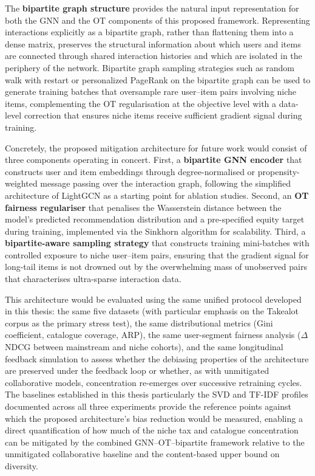 \documentclass[11pt,a4paper]{report}
\begin{document}
The \textbf{bipartite graph structure} provides the natural input representation for
both the GNN and the OT components of this proposed framework. Representing
interactions explicitly as a bipartite graph, rather than flattening them into a
dense matrix, preserves the structural information about which users and items are
connected through shared interaction histories and which are isolated in the periphery
of the network. Bipartite graph sampling strategies such as random walk with restart
\citep{tong2006fast} or personalized PageRank on the bipartite graph can be used
to generate training batches that oversample rare user--item pairs involving niche
items, complementing the OT regularisation at the objective level with a
data-level correction that ensures niche items receive sufficient gradient signal
during training.

Concretely, the proposed mitigation architecture for future work would consist of
three components operating in concert. First, a \textbf{bipartite GNN encoder}
that constructs user and item embeddings through degree-normalised or
propensity-weighted message passing over the interaction graph, following the
simplified architecture of LightGCN \citep{he2020lightgcn} as a starting point for
ablation studies. Second, an \textbf{OT fairness regulariser} that penalises the
Wasserstein distance between the model's predicted recommendation distribution and
a pre-specified equity target during training, implemented via the Sinkhorn
algorithm for scalability. Third, a \textbf{bipartite-aware sampling strategy} that
constructs training mini-batches with controlled exposure to niche user--item pairs,
ensuring that the gradient signal for long-tail items is not drowned out by the
overwhelming mass of unobserved pairs that characterises ultra-sparse interaction
data.

This architecture would be evaluated using the same unified protocol developed in
this thesis: the same five datasets (with particular emphasis on the Takealot corpus
as the primary stress test), the same distributional metrics (Gini coefficient,
catalogue coverage, ARP), the same user-segment fairness analysis ($\Delta$NDCG
between mainstream and niche cohorts), and the same longitudinal feedback simulation
to assess whether the debiasing properties of the architecture are preserved under
the feedback loop or whether, as with unmitigated collaborative models, concentration
re-emerges over successive retraining cycles. The baselines established in this
thesis particularly the SVD and TF-IDF profiles documented across all three
experiments provide the reference points against which the proposed architecture's
bias reduction would be measured, enabling a direct quantification of how much of
the niche tax and catalogue concentration can be mitigated by the combined
GNN--OT--bipartite framework relative to the unmitigated collaborative baseline and
the content-based upper bound on diversity.
\end{document}
